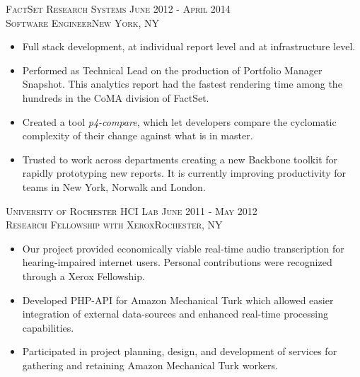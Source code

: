 \documentclass[oneside, final]{scrartcl}
\begin{document}
\begin{center}
\textsc{FactSet Research Systems \hfill June 2012 - April 2014\\}
\textsc{Software Engineer\hfill New York, NY\\}
\begin{itemize}
	\setlength{\itemsep}{1pt}
	\setlength{\parskip}{0pt}
	\setlength{\parsep}{0pt}
	\setlength{\leftmargin}{-5mm}
	\item Full stack development, at individual report level and at infrastructure level.
	\item Performed as Technical Lead on the production of Portfolio Manager Snapshot. This analytics report had the fastest rendering time among the hundreds in the CoMA division of FactSet.
	\item Created a tool \textit{p4-compare}, which let developers compare the cyclomatic complexity of their change against what is in master.
	\item Trusted to work across departments creating a new Backbone toolkit for rapidly prototyping new reports. It is currently improving productivity for teams in New York, Norwalk and London.
\end{itemize}

\textsc{University of Rochester HCI Lab \hfill June 2011 - May 2012\\}
\textsc{Research Fellowship with Xerox\hfill Rochester, NY\\}
\begin{itemize}
 \setlength{\itemsep}{1pt}
  \setlength{\parskip}{0pt}
  \setlength{\parsep}{0pt}
 \setlength{\leftmargin}{-5mm}
  \item Our project provided economically viable real-time audio transcription for hearing-impaired internet users. Personal contributions were recognized through a Xerox Fellowship.
  \item Developed PHP-API for Amazon Mechanical Turk which allowed easier integration of external data-sources and enhanced real-time processing capabilities.
  \item Participated in project planning, design, and development of services for gathering and retaining Amazon Mechanical Turk workers.
\end{itemize}




\end{center}
\end{document}
